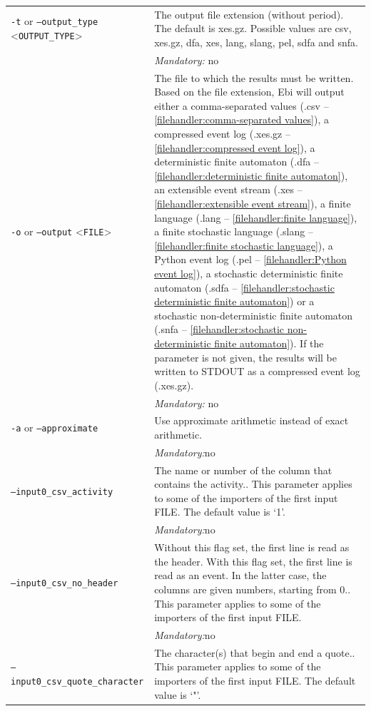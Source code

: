 {\begin{tabularx}{\linewidth}{lX}
\texttt{-t} or \texttt{--output\_type} <\texttt{OUTPUT\_TYPE}> &
The output file extension (without period). The default is xes.gz. Possible values are csv, xes.gz, dfa, xes, lang, slang, pel, sdfa and snfa.\\
&\textit{Mandatory:} \quad no\\
\texttt{-o} or \texttt{--output} <\texttt{FILE}> &
The file to which the results must be written. Based on the file extension, Ebi will output either a comma-separated values (.csv -- \cref{filehandler:comma-separated values}), a compressed event log (.xes.gz -- \cref{filehandler:compressed event log}), a deterministic finite automaton (.dfa -- \cref{filehandler:deterministic finite automaton}), an extensible event stream (.xes -- \cref{filehandler:extensible event stream}), a finite language (.lang -- \cref{filehandler:finite language}), a finite stochastic language (.slang -- \cref{filehandler:finite stochastic language}), a Python event log (.pel -- \cref{filehandler:Python event log}), a stochastic deterministic finite automaton (.sdfa -- \cref{filehandler:stochastic deterministic finite automaton}) or a stochastic non-deterministic finite automaton (.snfa -- \cref{filehandler:stochastic non-deterministic finite automaton}).
If the parameter is not given, the results will be written to STDOUT as a compressed event log (.xes.gz).\\
&\textit{Mandatory:} \quad no\\
\texttt{-a} or \texttt{--approximate} & Use approximate arithmetic instead of exact arithmetic.\\
&\textit{Mandatory:}\quad no\\
\texttt{--input0\_csv\_activity} & The name or number of the column that contains the activity.. This parameter applies to some of the importers of the first input FILE. The default value is `1'.\\
&\textit{Mandatory:}\quad no\\
\texttt{--input0\_csv\_no\_header} & Without this flag set, the first line is read as the header. 
    With this flag set, the first line is read as an event. In the latter case, the columns are given numbers, starting from 0.. This parameter applies to some of the importers of the first input FILE. \\
&\textit{Mandatory:}\quad no\\
\texttt{--input0\_csv\_quote\_character} & The character(s) that begin and end a quote.. This parameter applies to some of the importers of the first input FILE. The default value is `"'.\\

\end{tabularx}}
